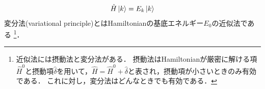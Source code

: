 \documentclass{report}
\begin{document}
  \begin{align}
    \hat{H}\ket{k} = E_k\ket{k}\label{SE}
  \end{align}
  変分法(variational principle)とはHamiltonianの基底エネルギー$E_0$の近似法である
  \footnote{
    近似法には摂動法と変分法がある．
    摂動法はHamiltonianが厳密に解ける項$\hat{H}^0$と摂動項$\hat{\delta}$を用いて，$\hat{H}=\hat{H}^0+\hat{\delta}$と表され，摂動項が小さいときのみ有効である．
    これに対し，変分法はどんなときでも有効である．
  }．
\end{document}

